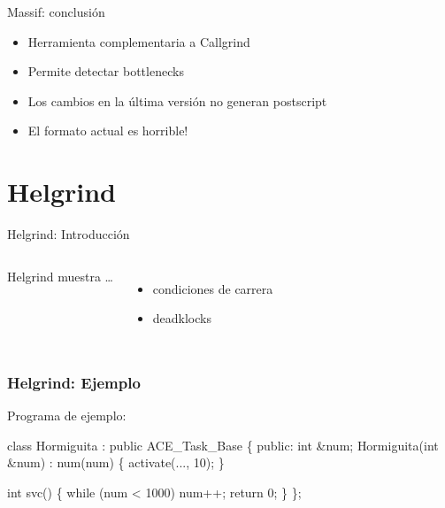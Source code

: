 \documentclass{beamer}
\begin{document}
\begin{frame}{Massif: conclusi\'on}
\begin{itemize}
  \item Herramienta complementaria a Callgrind
  \item Permite detectar bottlenecks
  \item Los cambios en la \'ultima versi\'on no generan postscript
  \item El formato actual es horrible!
\end{itemize}
\end{frame}



\section{Helgrind}

\begin{frame}{Helgrind: Introducci\'on}
\begin{columns}[onlytextwidth]
  Helgrind muestra \ldots
  \begin{itemize}
    \item condiciones de carrera
    \item deadklocks
  \end{itemize}
\end{columns}
\end{frame}

\begin{frame}[fragile]
\frametitle{Helgrind: Ejemplo}
Programa de ejemplo:
\begin{semiverbatim}

class {\color{green}Hormiguita} : public {\color{green}ACE_Task_Base} \{
  public:
  int \&num;
  {\color{green}Hormiguita}(int \&num) : num(num) \{
    activate(..., 10);
  \}

  int svc() \{
    \alert{ while (num < 1000) num++; }
    return 0;
  \}
\};
\end{semiverbatim}
\end{frame}
\end{document}
